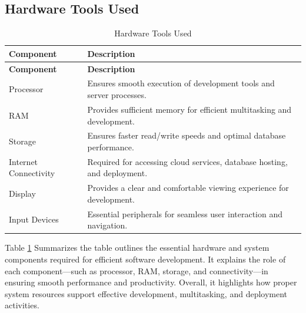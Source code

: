 \documentclass[a4paper, 12pt]{report}
\begin{document}
\subsection{Hardware Tools Used}
\begin{longtable}{|p{}|p{}|}
    \caption{Hardware Tools Used}\label{tab:hardware_tools} \\
    
    \hline
    \textbf{Component} & \textbf{Description} \\
    \hline
    \endfirsthead
    
    \hline
    \textbf{Component} & \textbf{Description} \\
    \hline
    \endhead
    
    \hline
    \endfoot
    
    \hline
    \endlastfoot
    
    Processor & Ensures smooth execution of development tools and server processes. \\
    \hline
   RAM  & Provides sufficient memory for efficient multitasking and development. \\
    \hline
    Storage     & Ensures faster read/write speeds and optimal database performance. \\
    \hline
    Internet Connectivity & Required for accessing cloud services, database hosting, and deployment. \\
    \hline
    Display    & Provides a clear and comfortable viewing experience for development.\\
    \hline
    Input Devices & Essential peripherals for seamless user interaction and navigation.\\
\end{longtable}
 Table \ref{tab:hardware_tools} Summarizes the table outlines the essential hardware and system components required for efficient software development. It explains the role of each component—such as processor, RAM, storage, and connectivity—in ensuring smooth performance and productivity. Overall, it highlights how proper system resources support effective development, multitasking, and deployment activities.
\end{document}
